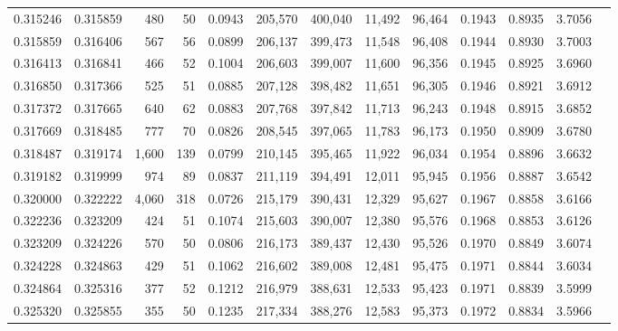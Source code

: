 \begin{tabular}{rrrrrrrrrrrrr}
0.315246 & 0.315859 &   480 &  50 &                                     0.0943 & 205,570 & 400,040 &  11,492 &  96,464 & 0.1943 & 0.8935 & 3.7056 \\
0.315859 & 0.316406 &   567 &  56 &                                     0.0899 & 206,137 & 399,473 &  11,548 &  96,408 & 0.1944 & 0.8930 & 3.7003 \\
0.316413 & 0.316841 &   466 &  52 &                                     0.1004 & 206,603 & 399,007 &  11,600 &  96,356 & 0.1945 & 0.8925 & 3.6960 \\
0.316850 & 0.317366 &   525 &  51 &                                     0.0885 & 207,128 & 398,482 &  11,651 &  96,305 & 0.1946 & 0.8921 & 3.6912 \\
0.317372 & 0.317665 &   640 &  62 &                                     0.0883 & 207,768 & 397,842 &  11,713 &  96,243 & 0.1948 & 0.8915 & 3.6852 \\
0.317669 & 0.318485 &   777 &  70 &                                     0.0826 & 208,545 & 397,065 &  11,783 &  96,173 & 0.1950 & 0.8909 & 3.6780 \\
0.318487 & 0.319174 & 1,600 & 139 &                                     0.0799 & 210,145 & 395,465 &  11,922 &  96,034 & 0.1954 & 0.8896 & 3.6632 \\
0.319182 & 0.319999 &   974 &  89 &                                     0.0837 & 211,119 & 394,491 &  12,011 &  95,945 & 0.1956 & 0.8887 & 3.6542 \\
0.320000 & 0.322222 & 4,060 & 318 &                                     0.0726 & 215,179 & 390,431 &  12,329 &  95,627 & 0.1967 & 0.8858 & 3.6166 \\
0.322236 & 0.323209 &   424 &  51 &                                     0.1074 & 215,603 & 390,007 &  12,380 &  95,576 & 0.1968 & 0.8853 & 3.6126 \\
0.323209 & 0.324226 &   570 &  50 &                                     0.0806 & 216,173 & 389,437 &  12,430 &  95,526 & 0.1970 & 0.8849 & 3.6074 \\
0.324228 & 0.324863 &   429 &  51 &                                     0.1062 & 216,602 & 389,008 &  12,481 &  95,475 & 0.1971 & 0.8844 & 3.6034 \\
0.324864 & 0.325316 &   377 &  52 &                                     0.1212 & 216,979 & 388,631 &  12,533 &  95,423 & 0.1971 & 0.8839 & 3.5999 \\
0.325320 & 0.325855 &   355 &  50 &                                     0.1235 & 217,334 & 388,276 &  12,583 &  95,373 & 0.1972 & 0.8834 & 3.5966 \\

\end{tabular}

